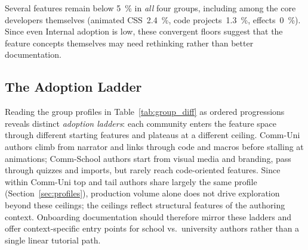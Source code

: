 Several features remain below \SI{5}{\percent} in \emph{all} four
groups, including among the core developers themselves
(animated CSS~\SI{2.4}{\percent}, code projects~\SI{1.3}{\percent},
effects~\SI{0}{\percent}).
Since even Internal adoption is low, these convergent floors suggest
that the feature concepts themselves may need rethinking rather than
better documentation.

\subsection{The Adoption Ladder}
\label{sec:ladder}

Reading the group profiles in Table~\ref{tab:group_diff} as ordered
progressions reveals distinct \emph{adoption ladders}: each community
enters the feature space through different starting features and
plateaus at a different ceiling.
Comm-Uni authors climb from narrator and links through code and macros
before stalling at animations; Comm-School authors start from visual
media and branding, pass through quizzes and imports, but rarely reach
code-oriented features.
Since within Comm-Uni top and tail authors share largely the same
profile (Section~\ref{sec:profiles}), production volume alone does
not drive exploration beyond these ceilings; the ceilings reflect
structural features of the authoring context.
Onboarding documentation should therefore mirror these ladders and
offer context-specific entry points for school vs.\ university authors
rather than a single linear tutorial path.

